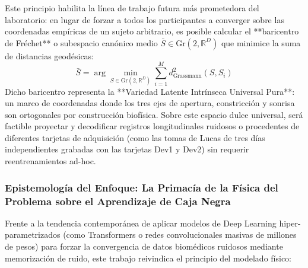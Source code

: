 \documentclass[11pt,a4paper]{article}
\begin{document}
Este principio habilita la línea de trabajo futura más prometedora del laboratorio: en lugar de forzar a todos los participantes a converger sobre las coordenadas empíricas de un sujeto arbitrario, es posible calcular el **baricentro de Fréchet** o subespacio canónico medio $\bar{S} \in \text{Gr}(2, \mathbb{R}^D)$ que minimice la suma de distancias geodésicas:
\begin{equation}
\bar{S} = \arg\min_{S \in \text{Gr}(2, \mathbb{R}^D)} \sum_{i=1}^M d_{\text{Grassmann}}^2(S, S_i)
\end{equation}
Dicho baricentro representa la **Variedad Latente Intrínseca Universal Pura**: un marco de coordenadas donde los tres ejes de apertura, constricción y sonrisa son ortogonales por construcción biofísica. Sobre este espacio dulce universal, será factible proyectar y decodificar registros longitudinales ruidosos o procedentes de diferentes tarjetas de adquisición (como las tomas de Lucas de tres días independientes grabadas con las tarjetas Dev1 y Dev2) sin requerir reentrenamientos ad-hoc.

\subsubsection{Epistemología del Enfoque: La Primacía de la Física del Problema sobre el Aprendizaje de Caja Negra}
\label{subsubsec:primacia_fisica_sobre_caja_negra}

Frente a la tendencia contemporánea de aplicar modelos de Deep Learning hiper-parametrizados (como Transformers o redes convolucionales masivas de millones de pesos) para forzar la convergencia de datos biomédicos ruidosos mediante memorización de ruido, este trabajo reivindica el principio del modelado físico:
\end{document}
